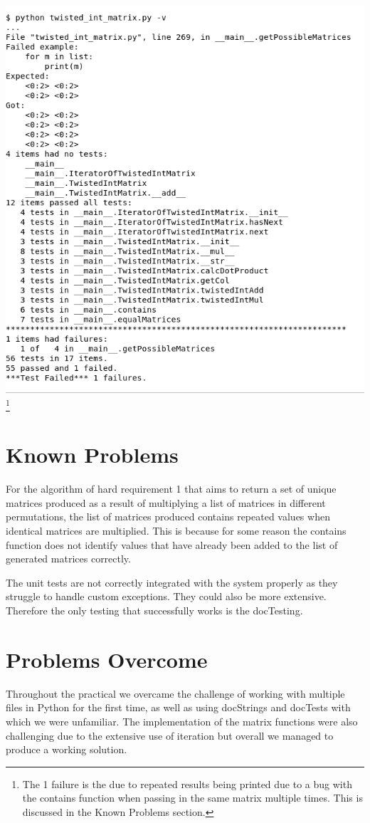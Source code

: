 \documentclass[11]{article}
\begin{document}
			\includegraphics[scale=0.5]{Test2.png} \footnote{The 1 failure is the due to repeated results being printed due to a bug with the contains function when passing in the same matrix multiple times. This is discussed in the Known Problems section.}
		
	\section{Known Problems}
		For the algorithm of hard requirement 1 that aims to return a set of unique matrices produced as a result of multiplying a list of matrices in different permutations, the list of matrices produced contains repeated values when identical matrices are multiplied. This is because for some reason the contains function does not identify values that have already been added to the list of generated matrices correctly.
		
The unit tests are not correctly integrated with the system properly as they struggle to handle custom exceptions. They could also be more extensive. Therefore the only testing that successfully works is the docTesting.
		
	\section{Problems Overcome}
	Throughout the practical we overcame the challenge of working with multiple files in Python for the first time, as well as using docStrings and docTests with which we were unfamiliar. The implementation of the matrix functions were also challenging due to the extensive use of iteration but overall we managed to produce a working solution.
\end{document}
